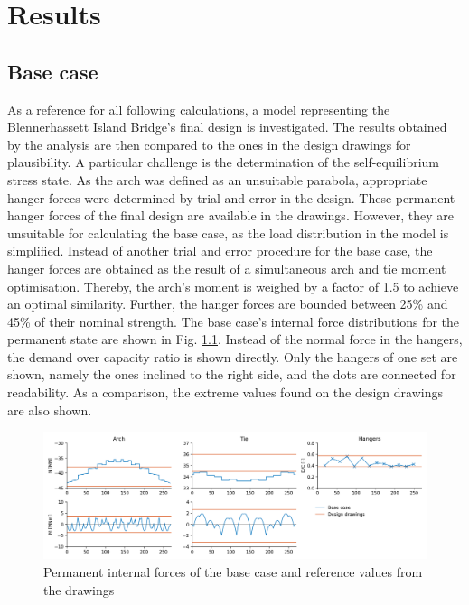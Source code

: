 \chapter{Results}\label{sec:results}

\section{Base case}
As a reference for all following calculations, a model representing the Blennerhassett Island Bridge's final design is investigated. The results obtained by the analysis are then compared to the ones in the design drawings for plausibility. A particular challenge is the determination of the self-equilibrium stress state. As the arch was defined as an unsuitable parabola, appropriate hanger forces were determined by trial and error in the design. These permanent hanger forces of the final design are available in the drawings. However, they are unsuitable for calculating the base case, as the load distribution in the model is simplified. Instead of another trial and error procedure for the base case, the hanger forces are obtained as the result of a simultaneous arch and tie moment optimisation. Thereby, the arch's moment is weighed by a factor of 1.5 to achieve an optimal similarity. Further, the hanger forces are bounded between 25\% and 45\% of their nominal strength. The base case's internal force distributions for the permanent state are shown in Fig. \ref{fig:base_case_permanent}. Instead of the normal force in the hangers, the demand over capacity ratio is shown directly. Only the hangers of one set are shown, namely the ones inclined to the right side, and the dots are connected for readability. As a comparison, the extreme values found on the design drawings are also shown.

\begin{figure}[H]
    \centering
    \includegraphics[width=\textwidth]{calculations/Base case/Permanent state.png}
    \caption{Permanent internal forces of the base case and reference values from the drawings}
    \label{fig:base_case_permanent}
\end{figure}

